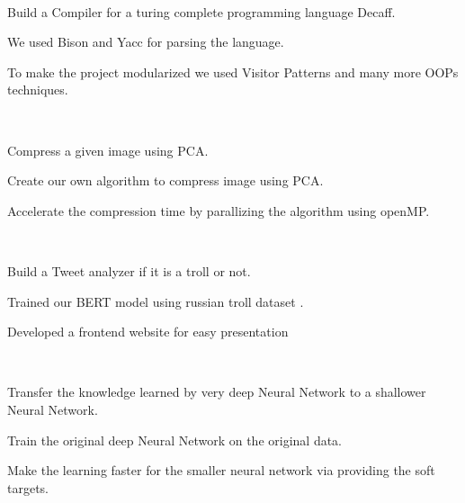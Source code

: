 \documentclass[]{resume-openfont}
\begin{document}
\\
\begin{tightemize}
    \item Build a Compiler for a turing complete programming language Decaff.
    \item We used Bison and Yacc for parsing the language.
    \item To make the project modularized we used Visitor Patterns and many more OOPs techniques.
\end{tightemize}
\sectionsep
  
\hfill \\
\begin{tightemize}
    \item Compress a given image using PCA.
    \item Create our own algorithm to compress image using PCA.
    \item Accelerate the compression time by parallizing the algorithm using openMP.
\end{tightemize}
\sectionsep

 \\
\begin{tightemize}
    \item Build a Tweet analyzer if it is a troll or not.
    \item Trained our BERT model using russian troll dataset .
    \item Developed a frontend website for easy presentation
\end{tightemize}
\sectionsep


 \\
\begin{tightemize}
    \item Transfer the knowledge learned by very deep Neural Network to a shallower Neural Network.
    \item Train the original deep Neural Network on the original data.
    \item Make the learning faster for the smaller neural network via providing the soft targets.
\end{tightemize}
\sectionsep
\end{document}
